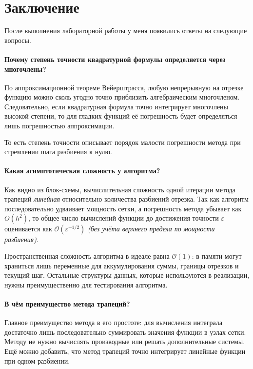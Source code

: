 \section{Заключение}

После выполнения лабораторной работы у меня появились ответы на следующие вопросы.

\paragraph{Почему степень точности квадратурной формулы определяется через многочлены?} По аппроксимационной теореме Вейерштрасса, любую непрерывную на отрезке функцию можно сколь угодно точно приблизить алгебраическим многочленом. Следовательно, если квадратурная формула точно интегрирует многочлены высокой степени, то для гладких функций её погрешность будет определяться лишь погрешностью аппроксимации.

То есть степень точности описывает порядок малости погрешности метода при стремлении шага разбиения к нулю.

\paragraph{Какая асимптотическая сложность у алгоритма?} Как видно из блок-схемы, вычислительная сложность одной итерации метода трапеций \textit{линейная} относительно количества разбиений отрезка. Так как алгоритм последовательно удваивает мощность сетки, а погрешность метода убывает как $O(h^2)$, то общее число вычислений функции до достижения точности $\varepsilon$ оценивается как $\mathcal{O}(\varepsilon^{-1/2})$ \textit{(без учёта верхнего предела по мощности разбиения)}.

Пространственная сложность алгоритма в идеале равна $\mathcal{O}(1)$: в памяти могут храниться лишь переменные для аккумулирования суммы, границы отрезков и текущий шаг. Остальные структуры данных, которые используются в реализации, нужны преимущественно для тестирования алгоритма.

\paragraph{В чём преимущество метода трапеций?} Главное преимущество метода в его простоте: для вычисления интеграла достаточно лишь последовательно суммировать значения функции в узлах сетки. Методу не нужно вычислять производные или решать дополнительные системы. Ещё можно добавить, что метод трапеций точно интегрирует линейные функции при одном разбиении.

